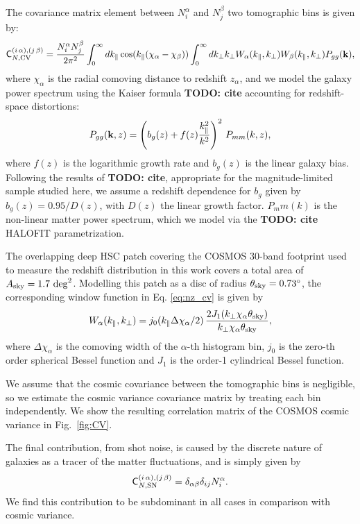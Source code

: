 \documentclass[a4paper,11pt]{article}
\newcommand{\todo}[1]{{\bf TODO: #1}}
\begin{document}
        The covariance matrix element between $N^\alpha_i$ and $N^\beta_j$ two tomographic bins is given by:
        \begin{equation}\label{eq:nz_cv}
          {\sf C}_{N,{\rm CV}}^{(i\,\alpha),(j\,\beta)}=\frac{N^\alpha_iN^\beta_j}{2\pi^2} \int_0^\infty dk_\parallel \cos(k_\parallel(\chi_\alpha-\chi_\beta))\int_0^\infty dk_\perp k_\perp W_\alpha(k_\parallel,k_\perp)W_\beta(k_\parallel,k_\perp)P_{gg}({\bf k}),
        \end{equation}
        where $\chi_\alpha$ is the radial comoving distance to redshift $z_\alpha$, and we model the galaxy power spectrum using the Kaiser formula \todo{cite} accounting for redshift-space distortions:
        \begin{equation}
          P_{gg}({\bf k},z)=\left(b_g(z)+f(z)\frac{k_\parallel^2}{k^2}\right)^2\,P_{mm}(k,z),
        \end{equation}
        where $f(z)$ is the logarithmic growth rate and $b_g(z)$ is the linear galaxy bias. Following the results of \todo{cite}, appropriate for the magnitude-limited sample studied here, we assume a redshift dependence for $b_g$ given by $b_g(z) = 0.95/D(z)$, with $D(z)$ the linear growth factor. $P_mm(k)$ is the non-linear matter power spectrum, which we model via the \todo{cite} HALOFIT parametrization.

        The overlapping deep HSC patch covering the COSMOS 30-band footprint used to measure the redshift distribution in this work covers a total area of $A_{\rm sky} = 1.7 \ {\rm deg}^2$. Modelling this patch as a disc of radius $\theta_{\rm sky}=0.73^\circ$, the corresponding window function in Eq. \ref{eq:nz_cv} is given by
        \begin{equation}
          W_\alpha(k_\parallel,k_\perp)=j_0(k_\parallel\Delta\chi_\alpha/2)\,\frac{2 J_1(k_\perp \chi_\alpha\theta_{\rm sky})}{k_\perp \chi_\alpha\theta_{\rm sky}},
        \end{equation}
        where $\Delta\chi_\alpha$ is the comoving width of the $\alpha$-th histogram bin, $j_0$ is the zero-th order spherical Bessel function and $J_1$ is the order-1 cylindrical Bessel function.

        We assume that the cosmic covariance between the tomographic bins is negligible, so we estimate the cosmic variance covariance matrix by treating each bin independently. We show the resulting correlation matrix of the COSMOS cosmic variance in Fig.~\ref{fig:CV}.
        
        The final contribution, from shot noise, is caused by the discrete nature of galaxies as a tracer of the matter fluctuations, and is simply given by
        \begin{equation}
          {\sf C}^{(i\,\alpha),(j\,\beta)}_{N,{\rm SN}}=\delta_{\alpha\beta}\delta_{ij}N^\alpha_i.
        \end{equation}
        We find this contribution to be subdominant in all cases in comparison with cosmic variance.
\end{document}
